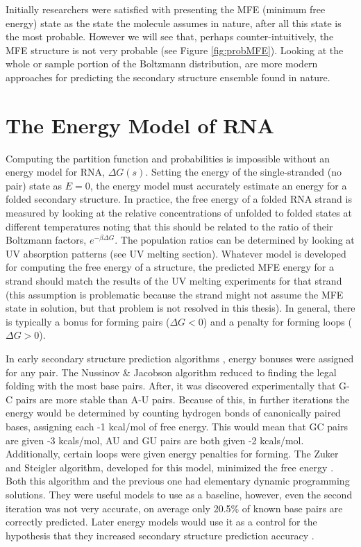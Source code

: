 Initially researchers were satisfied with presenting the MFE (minimum
free energy) state as the state the molecule assumes in nature, after
all this state is the most probable. However we will see that, perhaps
counter-intuitively, the MFE structure is not very probable (see Figure
\ref{fig:probMFE}). Looking at the whole or sample portion of
the Boltzmann distribution, are more modern approaches for predicting
the secondary structure ensemble found in nature.

\section{The Energy Model of RNA}

Computing the partition function and probabilities is impossible
without an energy model for RNA, $\Delta G(s)$. Setting the energy of
the single-stranded (no pair) state as $E = 0$, the energy model must
accurately estimate an energy for a folded secondary structure. In
practice, the free energy of a folded RNA strand is measured by
looking at the relative concentrations of unfolded to folded states at
different temperatures noting that this should be related to the ratio
of their Boltzmann factors, $e^{-\beta \Delta G}$. The population
ratios can be determined by looking at UV absorption patterns (see UV
melting section). Whatever model is developed for computing the free
energy of a structure, the predicted MFE energy for a strand should
match the results of the UV melting experiments for that strand (this
assumption is problematic because the strand might not assume the MFE
state in solution, but that problem is not resolved in this
thesis). In general, there is typically a bonus for forming pairs
($\Delta G < 0$) and a penalty for forming loops ($\Delta G > 0$).

In early secondary structure prediction algorithms
\cite{nussinov1980fast}, energy bonuses were assigned for any pair.
The Nussinov \& Jacobson algorithm reduced to finding the legal
folding with the most base pairs. After, it was discovered
experimentally that G-C pairs are more stable than A-U pairs. Because
of this, in further iterations the energy would be determined by
counting hydrogen bonds of canonically paired bases, assigning each
-1 kcal/mol of free energy. This would mean that GC pairs are given -3
kcals/mol, AU and GU pairs are both given -2 kcals/mol. Additionally,
certain loops were given energy penalties for forming. The Zuker and
Steigler algorithm, developed for this model, minimized the free
energy \cite{zuker1981optimal}. Both this algorithm and the previous
one had elementary dynamic programming solutions. They were useful
models to use as a baseline, however, even the second iteration was
not very accurate, on average only 20.5\% of known base pairs are
correctly predicted. Later energy models would use it as a control for
the hypothesis that they increased secondary structure prediction
accuracy \cite{mathews1999expanded}. 

